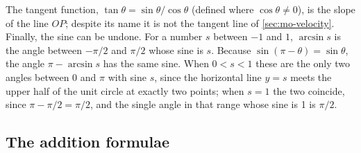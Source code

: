 The tangent function, $\tan\theta = \sin\theta/\cos\theta$ (defined where
$\cos\theta \neq 0$), is the slope of the line $OP$; despite its name it
is not the tangent line of \cref{sec:mo-velocity}. Finally, the sine can
be undone. For a number $s$ between $-1$ and $1$, $\arcsin s$ is the angle
between $-\pi/2$ and $\pi/2$ whose sine is $s$. Because $\sin(\pi - \theta)
= \sin\theta$, the angle $\pi - \arcsin s$ has the same sine. When $0 < s
< 1$ these are the only two angles between 0 and $\pi$ with sine $s$,
since the horizontal line $y = s$ meets the upper half of the unit
circle at exactly two points;
when $s = 1$ the two coincide, since $\pi - \pi/2 = \pi/2$, and the
single angle in that range whose sine is 1 is $\pi/2$.

\subsection*{The addition formulae}

